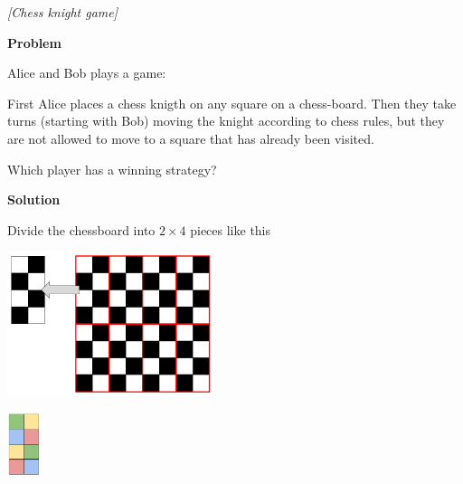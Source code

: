

%




\noindent 

\begin{problem}
\textit{[Chess knight game]}

\textbf{Problem}

Alice and Bob plays a game:

First Alice places a chess knigth on any square on a chess-board. Then they take turns (starting with Bob) moving the knight according to chess rules, but they are not allowed to move to a square that has already been visited.

Which player has a winning strategy?

\textbf{Solution}

Divide the chessboard into $2 \times 4$ pieces like this
\begin{center}
\includegraphics[width=6cm]{division.png}
\label{fig:divisionOfChessboard}
\end{center} 

\begin{center}
\includegraphics[width=1cm]{coloring.png}
\label{fig:coloring}
\end{center} 

\end{problem}
%





